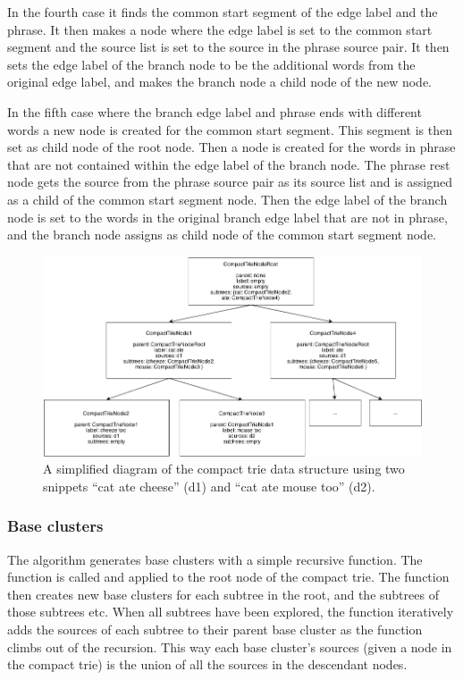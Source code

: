 In the fourth case it finds the common start segment of the edge label and the phrase. It then makes a node where the edge label is set to the common start segment and the source list is set to the source in the phrase source pair. It then sets the edge label of the branch node to be the additional words from the original edge label, and makes the branch node a child node of the new node.

In the fifth case where the branch edge label and phrase ends with different words a new node is created for the common start segment. This segment is then set as child node of the root node. Then a node is created for the words in phrase that are not contained within the edge label of the branch node. The phrase rest node gets the source from the phrase source pair as its source list and is assigned as a child of the common start segment node. Then the edge label of the branch node is set to the words in the original branch edge label that are not in phrase, and the branch node assigns as child node of the common start segment node.

\begin{figure}[!ht]
  \begin{center}
    \includegraphics[totalheight=0.3\textheight]{Figures/compacttriedatastructure}
  \end{center}
  \caption{A simplified diagram of the compact trie data structure using two snippets “cat ate cheese” (d1) and “cat ate mouse too” (d2).}
  \label{fig:compacttriedatastructure}
\end{figure}

\subsubsection{Base clusters}

The \CTC algorithm generates base clusters with a simple recursive function. The function is called and applied to the root node of the compact trie. The function then creates new base clusters for each subtree in the root, and the subtrees of those subtrees etc. When all subtrees have been explored, the function iteratively adds the sources of each subtree to their parent base cluster as the function climbs out of the recursion. This way each base cluster's sources (given a node in the compact trie) is the union of all the sources in the descendant nodes.

